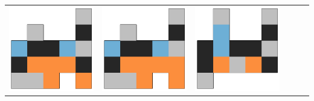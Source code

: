 \begin{tabular}{cccccc}
    \includegraphics[scale=0.1]{images/top_designs/pusher/ga/exp3/gen29_ind3} &
    \includegraphics[scale=0.1]{images/top_designs/pusher/ga/exp3/gen29_ind4} &
    \includegraphics[scale=0.1]{images/top_designs/pusher/ga/exp3/gen29_ind5} \\

\end{tabular}
